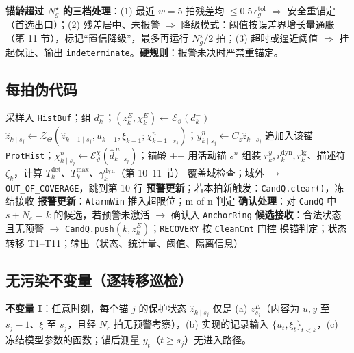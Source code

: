 \documentclass[11pt,a4paper]{ctexart}
\theoremstyle{remark}
\newcommand{\ZT}{\mathcal{Z}_{\Theta}}
\newcommand{\Enc}{\mathcal{E}_{\vartheta}}
\begin{document}
\textbf{锚龄超过 $N^\star_g$ 的三档处理}：(1) 最近 $w{=}5$ 拍残差均 $\le0.5\,\epsilon^{\mathrm{tol}}_g$ $\Rightarrow$ 安全重锚定（首选出口）；(2) 残差居中、未报警 $\Rightarrow$ 降级模式：阈值按误差界增长量通胀（第 11 节），标记“置信降级”，最多再运行 $N^\star_g/2$ 拍；(3) 超时或逼近阈值 $\Rightarrow$ 挂起保证、输出 \texttt{indeterminate}。\textbf{硬规则}：报警未决时严禁重锚定。

\subsection{每拍伪代码}

\begin{algorithm}[H]
\caption{受保护在线监测（每拍 $k$）}
\begin{algorithmic}[1]
\State 采样入 \texttt{HistBuf}；组 $d^-_k$；$(z^E_k,\chi^E_k)\leftarrow\Enc(d^-_k)$
  \State $\hat z_{k\mid s_j}\leftarrow\ZT(\hat z_{k-1\mid s_j},u_{k-1},\xi_{k-1};\chi^n_{k-1\mid s_j})$；$\hat y^n_{k\mid s_j}\leftarrow C_z\hat z_{k\mid s_j}$ 追加入该锚 \texttt{ProtHist}；$\chi^n_{k\mid s_j}\leftarrow\mathcal E^\chi_\vartheta(\hat d^{\,n}_{k\mid s_j})$；锚龄 ++
\EndFor
\State 用活动锚 $s^n$ 组装 $r^y_k,r^{\mathrm{dyn}}_k,r^{\mathrm{lg}}_k$、描述符 $\zeta_k$，计算 $T^{\mathrm{det}}_k$、$T^{\max}_k$、$\gamma^{\mathrm{dyn}}_k$（第 10--11 节）
\State 覆盖域检查；域外 $\to$ \texttt{OUT\_OF\_COVERAGE}，跳到第 10 行
\State \textbf{预警更新}；若本拍新触发：\texttt{CandQ.clear()}，冻结接收 
\State \textbf{报警更新}：\texttt{AlarmWin} 推入超限位；m-of-n 判定
\State \textbf{确认处理}：对 \texttt{CandQ} 中 $s+N_c=k$ 的候选，若预警未激活 $\to$ 确认入 \texttt{AnchorRing}
\State \textbf{候选接收}：合法状态且无预警 $\to$ \texttt{CandQ.push}$(k,z^E_k)$；\texttt{RECOVERY} 按 \texttt{CleanCnt} 门控
\State 换锚判定；状态转移 T1--T11；输出（状态、统计量、阈值、隔离信息）
\end{algorithmic}
\end{algorithm}

\subsection{无污染不变量（逐转移巡检）}

\textbf{不变量 I}：任意时刻，每个锚 $j$ 的保护状态 $\hat z_{k\mid s_j}$ 仅是 (a) $z^E_{s_j}$（内容为 $u,y$ 至 $s_j{-}1$、$\xi$ 至 $s_j$，且经 $N_c$ 拍无预警考察），(b) 实现的记录输入 $\{u_t,\xi_t\}_{t<k}$，(c) 冻结模型参数的函数；锚后测量 $y_t$（$t\ge s_j$）无进入路径。
\end{document}
